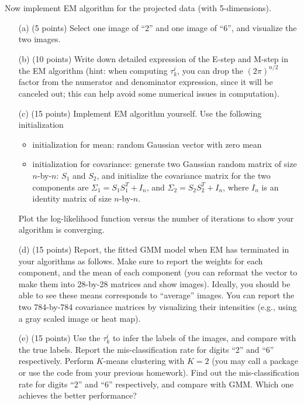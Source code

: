 \documentclass[12pt]{article}
\begin{document}
Now implement EM algorithm for the projected data (with 5-dimensions). 
\begin{enumerate}

\item[(a)] (5 points) Select one image of ``2'' and one image of ``6'', and visualize the two images. 

\item[(b)] (10 points) Write down detailed expression of the E-step and M-step in the EM algorithm (hint: when computing $\tau_k^i$, you can drop the $(2\pi)^{n/2}$ factor from the numerator and denominator expression, since it will be canceled out; this can help avoid some numerical issues in computation).

\item[(c)] (15 points) Implement EM algorithm yourself. Use the following initialization
\begin{itemize}
\item initialization for mean: random Gaussian vector with zero mean
\item initialization for covariance: generate two Gaussian random matrix of size $n$-by-$n$: $S_1$ and $S_2$, and initialize the covariance matrix for the two components are $\Sigma_1 = S_1 S_1^T + I_n$, and  $\Sigma_2 = S_2 S_2^T + I_n$, where $I_n$ is an identity matrix of size $n$-by-$n$. 
\end{itemize}
Plot the log-likelihood function versus the number of iterations to show your algorithm is converging.

\item[(d)] (15 points) Report, the fitted GMM model when EM has terminated in your algorithms as follows. Make sure to report the weights for each component, and the mean of each component (you can reformat the vector to make them into 28-by-28 matrices and show images). Ideally, you should be able to see these means corresponds to ``average'' images.  You can report the two 784-by-784 covariance matrices by visualizing their intensities (e.g., using a gray scaled image or heat map). 

\item[(e)] (15 points) Use the $\tau_{k}^i$ to infer the labels of the images, and compare with the true labels. Report the mis-classification rate for digits ``2'' and ``6'' respectively. Perform $K$-means clustering with $K=2$ (you may call a package or use the code from your previous homework). Find out the  mis-classification rate for digits ``2'' and ``6'' respectively, and compare with GMM. Which one achieves the better performance?

\end{enumerate}
\end{document}
